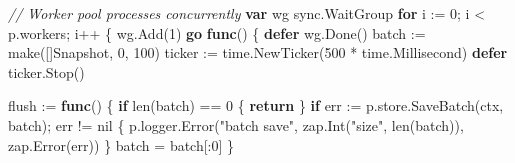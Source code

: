 \documentclass[
]{article}
\newenvironment{Shaded}{}{}
\newcommand{\BuiltInTok}[1]{\textcolor[rgb]{0.00,0.50,0.00}{#1}}
\newcommand{\CommentTok}[1]{\textcolor[rgb]{0.38,0.63,0.69}{\textit{#1}}}
\newcommand{\ControlFlowTok}[1]{\textcolor[rgb]{0.00,0.44,0.13}{\textbf{#1}}}
\newcommand{\DecValTok}[1]{\textcolor[rgb]{0.25,0.63,0.44}{#1}}
\newcommand{\KeywordTok}[1]{\textcolor[rgb]{0.00,0.44,0.13}{\textbf{#1}}}
\newcommand{\NormalTok}[1]{#1}
\newcommand{\OperatorTok}[1]{\textcolor[rgb]{0.40,0.40,0.40}{#1}}
\newcommand{\OtherTok}[1]{\textcolor[rgb]{0.00,0.44,0.13}{#1}}
\newcommand{\StringTok}[1]{\textcolor[rgb]{0.25,0.44,0.63}{#1}}
\begin{document}
\begin{Shaded}
\begin{Highlighting}[]
    \CommentTok{// Worker pool processes concurrently}
    \KeywordTok{var}\NormalTok{ wg sync}\OperatorTok{.}\NormalTok{WaitGroup}
    \ControlFlowTok{for}\NormalTok{ i }\OperatorTok{:=} \DecValTok{0}\OperatorTok{;}\NormalTok{ i }\OperatorTok{\textless{}}\NormalTok{ p}\OperatorTok{.}\NormalTok{workers}\OperatorTok{;}\NormalTok{ i}\OperatorTok{++} \OperatorTok{\{}
\NormalTok{        wg}\OperatorTok{.}\NormalTok{Add}\OperatorTok{(}\DecValTok{1}\OperatorTok{)}
        \ControlFlowTok{go} \KeywordTok{func}\OperatorTok{()} \OperatorTok{\{}
            \ControlFlowTok{defer}\NormalTok{ wg}\OperatorTok{.}\NormalTok{Done}\OperatorTok{()}
\NormalTok{            batch }\OperatorTok{:=} \BuiltInTok{make}\OperatorTok{([]}\NormalTok{Snapshot}\OperatorTok{,} \DecValTok{0}\OperatorTok{,} \DecValTok{100}\OperatorTok{)}
\NormalTok{            ticker }\OperatorTok{:=}\NormalTok{ time}\OperatorTok{.}\NormalTok{NewTicker}\OperatorTok{(}\DecValTok{500} \OperatorTok{*}\NormalTok{ time}\OperatorTok{.}\NormalTok{Millisecond}\OperatorTok{)}
            \ControlFlowTok{defer}\NormalTok{ ticker}\OperatorTok{.}\NormalTok{Stop}\OperatorTok{()}

\NormalTok{            flush }\OperatorTok{:=} \KeywordTok{func}\OperatorTok{()} \OperatorTok{\{}
                \ControlFlowTok{if} \BuiltInTok{len}\OperatorTok{(}\NormalTok{batch}\OperatorTok{)} \OperatorTok{==} \DecValTok{0} \OperatorTok{\{}
                    \ControlFlowTok{return}
                \OperatorTok{\}}
                \ControlFlowTok{if}\NormalTok{ err }\OperatorTok{:=}\NormalTok{ p}\OperatorTok{.}\NormalTok{store}\OperatorTok{.}\NormalTok{SaveBatch}\OperatorTok{(}\NormalTok{ctx}\OperatorTok{,}\NormalTok{ batch}\OperatorTok{);}\NormalTok{ err }\OperatorTok{!=} \OtherTok{nil} \OperatorTok{\{}
\NormalTok{                    p}\OperatorTok{.}\NormalTok{logger}\OperatorTok{.}\NormalTok{Error}\OperatorTok{(}\StringTok{"batch save"}\OperatorTok{,}\NormalTok{ zap}\OperatorTok{.}\NormalTok{Int}\OperatorTok{(}\StringTok{"size"}\OperatorTok{,} \BuiltInTok{len}\OperatorTok{(}\NormalTok{batch}\OperatorTok{)),}\NormalTok{ zap}\OperatorTok{.}\NormalTok{Error}\OperatorTok{(}\NormalTok{err}\OperatorTok{))}
                \OperatorTok{\}}
\NormalTok{                batch }\OperatorTok{=}\NormalTok{ batch}\OperatorTok{[:}\DecValTok{0}\OperatorTok{]}
            \OperatorTok{\}}


\end{Highlighting}
\end{Shaded}
\end{document}
